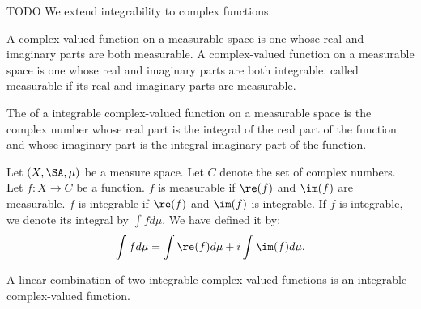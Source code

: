 
\sbasic


























\sstart
{}


TODO
We extend integrability
to complex functions.


A 
complex-valued function
on a measurable space is
one whose real and imaginary
parts are both measurable.
A 
complex-valued function
on a measurable space is
one whose real and imaginary
parts are both integrable.
called measurable if
its real and imaginary
parts are measurable.

The 
of a integrable complex-valued
function on a measurable space
is the complex number whose
real part is the integral
of the real part of the function
and whose imaginary part is the
integral imaginary part of the
function.



Let $(X, \SA, \mu)$
be a measure space.
Let $C$ denote the set
of complex numbers.
Let $f: X \to C$
be a function.
$f$ is measurable
if $\re(f)$ and $\im(f)$
are measurable.
$f$ is integrable if
$\re(f)$ and $\im(f)$
is integrable.
If $f$ is integrable,
we denote its integral
by $\int f d\mu$.
We have defined it by:
\[
  \int f d\mu = \int \re(f)d\mu
  + i\int \im(f) d\mu.
\]


\begin{prop}
A linear combination
of two integrable complex-valued
functions is an integrable
complex-valued function.
\end{prop}

